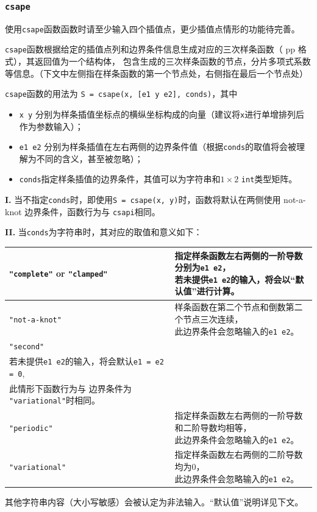 \subsubsection{\texttt{csape}}

使用\texttt{csape}函数函数时请至少输入四个插值点，更少插值点情形的功能待完善。

\texttt{csape}函数根据给定的插值点列和边界条件信息生成对应的三次样条函数（ pp 格式），其返回值为一个结构体，
包含生成的三次样条函数的节点，分片多项式系数等信息。（下文中左侧指在样条函数的第一个节点处，右侧指在最后一个节点处）

\texttt{csape}函数的用法为 \texttt{S = csape(x, [e1 y e2], conds)}，其中
\begin{itemize}
    \item \texttt{x y} 分别为样条插值坐标点的横纵坐标构成的向量（建议将\texttt{x}进行单增排列后作为参数输入）；
    \item \texttt{e1 e2} 分别为样条插值在左右两侧的边界条件值（根据\texttt{conds}的取值将会被理解为不同的含义，甚至被忽略）；
    \item \texttt{conds}指定样条插值的边界条件，其值可以为字符串和$1 \times 2$ \texttt{int}类型矩阵。
\end{itemize}


\textbf{I.} 当不指定\texttt{conds}时，即使用\texttt{S = csape(x, y)}时，函数将默认在两侧使用 not-a-knot 边界条件，函数行为与
\texttt{csapi}相同。

\textbf{II.} 当\texttt{conds}为字符串时，其对应的取值和意义如下：
\begin{table}[H]
    \centering
    \begin{tabular}{l|l}
        \hline
        \lstinline|"complete"| or \lstinline|"clamped"|
         & \makecell[l]{指定样条函数左右两侧的一阶导数分别为\texttt{e1 e2}， \\若未提供\texttt{e1 e2}的输入，将会以“默认值”进行计算。}\\
        \hline
        \lstinline|"not-a-knot"|
         & \makecell[l]{样条函数在第二个节点和倒数第二个节点三次连续，       \\此边界条件会忽略输入的\texttt{e1 e2}。}\\
        \hline
        \lstinline|"second"|
         & \makecell[l]{指定样条函数左右两侧的二阶导数分别为\texttt{e1 e2}， \\若未提供\texttt{e1 e2}的输入，将会默认\texttt{e1 = e2 = 0},\\此情形下函数行为与
        边界条件为 \lstinline|"variational"|时相同。}                        \\
        \hline
        \lstinline|"periodic"|
         & \makecell[l]{指定样条函数左右两侧的一阶导数和二阶导数均相等，     \\此边界条件会忽略输入的\texttt{e1 e2}。}\\
        \hline
        \lstinline|"variational"|
         & \makecell[l]{指定样条函数左右两侧的二阶导数均为0，                \\此边界条件会忽略输入的\texttt{e1 e2}。}\\
        \hline
    \end{tabular}
\end{table}
其他字符串内容（大小写敏感）会被认定为非法输入。“默认值”说明详见下文。

